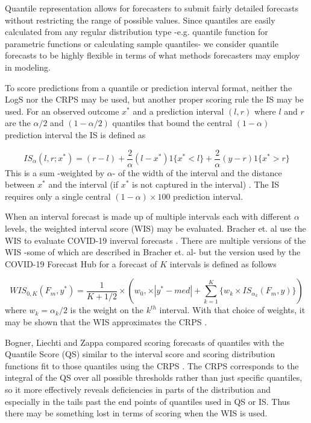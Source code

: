\documentclass[11pt,notitlepage]{isuthesis}
\begin{document}
Quantile representation allows for forecasters to submit fairly detailed
forecasts without restricting the range of possible values.
Since quantiles are easily calculated from any regular distribution type
-e.g. quantile function for parametric functions or calculating sample 
quantiles- we consider quantile forecasts to be highly flexible in terms of 
what methods forecasters may employ in modeling.

To score predictions from a quantile or prediction interval format, 
neither the LogS nor the CRPS may be used, 
but another proper scoring rule the IS may be used.
For an observed outcome $x^*$ and a prediction interval $(l,r)$ 
where $l$ and $r$ are the $\alpha/2$ and $(1-\alpha/2)$ quantiles that bound
the central $(1-\alpha)$ prediction interval the IS is defined as

\begin{equation}
\label{eq:is}
  IS_{\alpha}(l,r; x^*) = (r-l) + \frac{2}{\alpha}(l-x^*)1\{x^*<l\} 
  + \frac{2}{\alpha}(y-r)1\{x^* > r\}
\end{equation}
This is a sum -weighted by 
$\alpha$- of the width of the
interval and the distance between $x^*$ and the interval (if $x^*$ is not 
captured in the interval) \cite{gneiting2014probabilistic}. 
The IS requires only a single central 
$(1-\alpha) \times 100$ prediction interval.

When an interval forecast is made up of multiple intervals each with different
$\alpha$ levels, the weighted interval score (WIS) may be evaluated. Bracher et.
al use the WIS to evaluate COVID-19 inverval forecasts 
\cite{bracher2021evaluating}.
There are multiple versions of the WIS -some of 
which are described in Bracher et. al- but the version used by the COVID-19 
Forecast
Hub for a forecast of $K$ intervals is defined as follows

\begin{equation}
\label{eq:wis}
  WIS_{0,K}(F_m,y^*) = \frac{1}{K + 1/2} \times (w_0, \times |y^*-med|+
  \sum_{k=1}^K \{ w_k \times IS_{\alpha_k}(F_m,y) \} )
\end{equation}
where $w_k = \alpha_k/2$ is the weight on the $k^{th}$
interval. With that choice of weights, it may be shown that the
WIS approximates the CRPS \cite[see S1 Text therein]{bracher2021evaluating}.

Bogner, Liechti and Zappa compared scoring forecasts of quantiles with the 
Quantile Score (QS) similar to the interval score and scoring distribution functions
fit to those quantiles using the CRPS \cite{bogner2017combining}. The CRPS 
corresponds to the integral of the QS over all possible thresholds rather than
just specific quantiles, so it more effectively reveals deficiencies in parts of 
the distribution and especially in the tails past the end points of quantiles
used in QS or IS. Thus there may be something lost in terms of scoring when the 
WIS is used.
\end{document}
